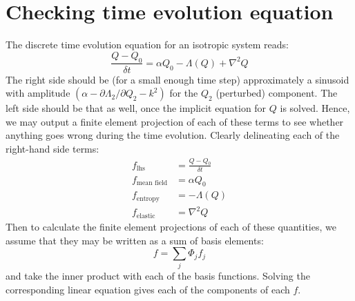 \documentclass[reqno]{article}
\begin{document}

\section{Checking time evolution equation}
The discrete time evolution equation for an isotropic system reads:
\begin{equation}
    \frac{Q - Q_0}{\delta t}
    =
    \alpha Q_0
    - \Lambda(Q)
    + \nabla^2 Q
\end{equation}
The right side should be (for a small enough time step) approximately a sinusoid with amplitude $\left(\alpha - \partial \Lambda_2 / \partial Q_2 - k^2\right)$ for the $Q_2$ (perturbed) component.
The left side should be that as well, once the implicit equation for $Q$ is solved.
Hence, we may output a finite element projection of each of these terms to see whether anything goes wrong during the time evolution.
Clearly delineating each of the right-hand side terms:
\begin{equation}
    \begin{split}
    f_\text{lhs} &= \frac{Q - Q_0}{\delta t} \\
    f_\text{mean field} &= \alpha Q_0 \\
    f_\text{entropy} &= -\Lambda(Q) \\
    f_\text{elastic} &= \nabla^2 Q
    \end{split}
\end{equation}
Then to calculate the finite element projections of each of these quantities, we assume that they may be written as a sum of basis elements:
\begin{equation}
    f = \sum_j \Phi_j f_j
\end{equation}
and take the inner product with each of the basis functions.
Solving the corresponding linear equation gives each of the components of each $f$.
\end{document}
